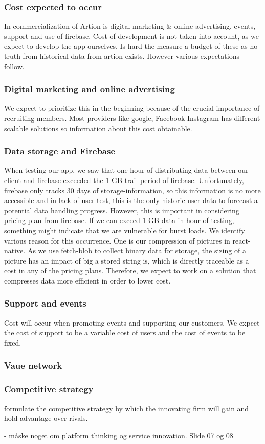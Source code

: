 \subsubsection{Cost expected to occur}
In commercialization of Artion is digital marketing & online advertising, events, support and use of firebase. Cost of development is not taken into account, as we expect to develop the app ourselves. Is hard the measure a budget of these as no truth from historical data from artion exists. However various expectations follow.

\subsubsection{Digital marketing and online advertising}
We expect to prioritize this in the beginning because of the crucial importance of recruiting members. Most providers like google, Facebook Instagram has different scalable solutions so information about this cost obtainable.

\subsubsection{Data storage and Firebase}
When testing our app, we saw that one hour of distributing data between our client and firebase exceeded the 1 GB trail period of firebase. Unfortunately, firebase only tracks 30 days of storage-information, so this information is no more accessible and in lack of user test, this is the only historic-user data to forecast a potential data handling progress. However, this is important in considering pricing plan from firebase. If we can exceed 1 GB data in hour of testing, something might indicate that we are vulnerable for burst loads. We identify various reason for this occurrence. One is our compression of pictures in react-native. As we use fetch-blob to collect binary data for storage, the sizing of a picture has an impact of big a stored string is, which is directly traceable as a cost in any of the pricing plans. Therefore, we expect to work on a solution that compresses data more efficient in order to lower cost.
\subsubsection{Support and events}
Cost will occur when promoting events and supporting our customers. We expect the cost of support to be a variable cost of users and the cost of events to be fixed.
\subsubsection{Vaue network}


\subsubsection{Competitive strategy}
formulate the competitive strategy by which the innovating firm will gain and hold advantage over rivals. 

 - måske noget om platform thinking og service innovation. Slide 07 og 08